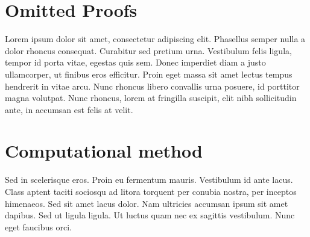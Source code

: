 \begin{appendices}

	\renewcommand{\thesection}{\Alph{section}}%

	\section{Omitted Proofs}

	Lorem ipsum dolor sit amet, consectetur adipiscing elit. Phasellus semper nulla a dolor rhoncus consequat. Curabitur sed pretium urna. Vestibulum felis ligula, tempor id porta vitae, egestas quis sem. Donec imperdiet diam a justo ullamcorper, ut finibus eros efficitur. Proin eget massa sit amet lectus tempus hendrerit in vitae arcu. Nunc rhoncus libero convallis urna posuere, id porttitor magna volutpat. Nunc rhoncus, lorem at fringilla suscipit, elit nibh sollicitudin ante, in accumsan est felis at velit.

	\newpage

	\section{Computational method}

	Sed in scelerisque eros. Proin eu fermentum mauris. Vestibulum id ante lacus. Class aptent taciti sociosqu ad litora torquent per conubia nostra, per inceptos himenaeos. Sed sit amet lacus dolor. Nam ultricies accumsan ipsum sit amet dapibus. Sed ut ligula ligula. Ut luctus quam nec ex sagittis vestibulum. Nunc eget faucibus orci.
\end{appendices}
